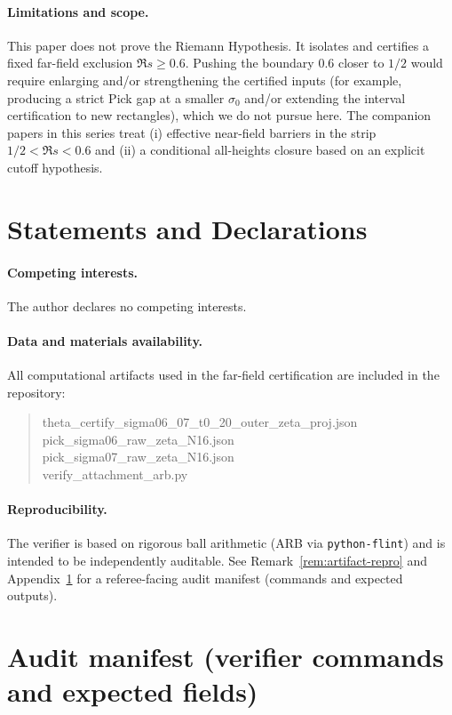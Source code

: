 \documentclass[11pt]{article}
\begin{document}
\paragraph{Limitations and scope.}
This paper does not prove the Riemann Hypothesis.
It isolates and certifies a fixed far-field exclusion $\Re s\ge 0.6$.
Pushing the boundary $0.6$ closer to $1/2$ would require enlarging and/or strengthening the certified inputs (for example, producing a strict Pick gap at a smaller $\sigma_0$ and/or extending the interval certification to new rectangles), which we do not pursue here.
The companion papers in this series treat (i) effective near-field barriers in the strip $1/2<\Re s<0.6$ and (ii) a conditional all-heights closure based on an explicit cutoff hypothesis.

\section*{Statements and Declarations}

\paragraph{Competing interests.}
The author declares no competing interests.

\paragraph{Data and materials availability.}
All computational artifacts used in the far-field certification are included in the repository:
\begin{quote}\small\ttfamily
theta\_certify\_sigma06\_07\_t0\_20\_outer\_zeta\_proj.json\\
pick\_sigma06\_raw\_zeta\_N16.json\\
pick\_sigma07\_raw\_zeta\_N16.json\\
verify\_attachment\_arb.py
\end{quote}

\paragraph{Reproducibility.}
The verifier is based on rigorous ball arithmetic (ARB via \texttt{python-flint}) and is intended to be independently auditable.
See Remark~\ref{rem:artifact-repro} and Appendix~\ref{app:audit} for a referee-facing audit manifest (commands and expected outputs).

\appendix
\section{Audit manifest (verifier commands and expected fields)}\label{app:audit}
\end{document}
